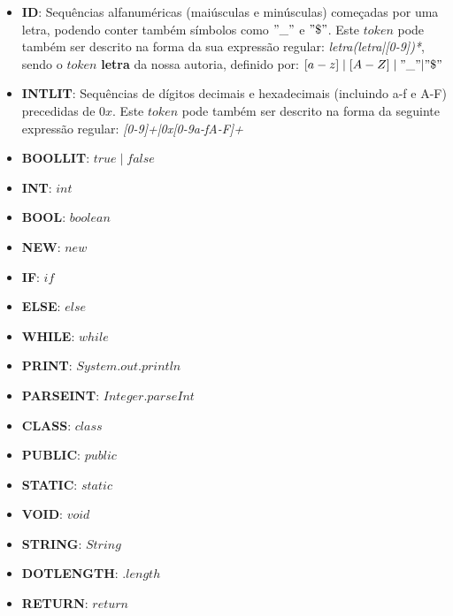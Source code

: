 \documentclass[11pt,a4paper]{article}
\begin{document}
	\begin{itemize}
	\item \textbf{ID}: Sequências alfanuméricas (maiúsculas e minúsculas) começadas por uma letra, podendo conter também símbolos como $"\_"$ e $"\$"$. Este $token$ pode também ser descrito na forma da sua expressão regular: \emph{{letra}({letra}|{[0-9]})*}, sendo o $token$ \textbf{letra} da nossa autoria, definido por: $[a-z] \mid [A-Z] \mid "\_"|"\$"$
	
	\item \textbf{INTLIT}: Sequências de dígitos decimais e hexadecimais (incluindo a-f e A-F) precedidas de $0x$. Este $token$ pode também ser descrito na forma da seguinte expressão regular: \emph{{[0-9]}+|0x[0-9a-fA-F]+}
	
	\item \textbf{BOOLLIT}: $true \mid false$
	
	\item \textbf{INT}: $int$
	
	\item \textbf{BOOL}: $boolean$
	
	\item \textbf{NEW}: $new$
	
	\item \textbf{IF}: $if$
	
	\item \textbf{ELSE}: $else$
	
	\item \textbf{WHILE}: $while$
	
	\item \textbf{PRINT}: $System.out.println$
	
	\item \textbf{PARSEINT}: $Integer.parseInt$
	
	\item \textbf{CLASS}: $class$
	
	\item \textbf{PUBLIC}: $public$
	
	\item \textbf{STATIC}: $static$
	
	\item \textbf{VOID}: $void$
	
	\item \textbf{STRING}: $String$
	
	\item \textbf{DOTLENGTH}: $.length$
	
	\item \textbf{RETURN}: $return$
	

\end{itemize}
\end{document}

